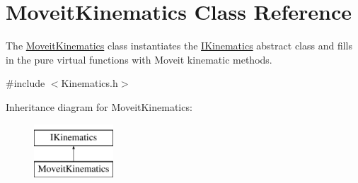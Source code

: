 \hypertarget{classMoveitKinematics}{\section{Moveit\-Kinematics Class Reference}
\label{classMoveitKinematics}
}


The \hyperlink{classMoveitKinematics}{Moveit\-Kinematics} class instantiates the \hyperlink{classIKinematics}{I\-Kinematics} abstract class and fills in the pure virtual functions with Moveit kinematic methods.  




{\ttfamily \#include $<$Kinematics.\-h$>$}

Inheritance diagram for Moveit\-Kinematics\-:\begin{figure}[H]
\begin{center}
\leavevmode
\includegraphics[height=2.000000cm]{classMoveitKinematics}
\end{center}
\end{figure}

